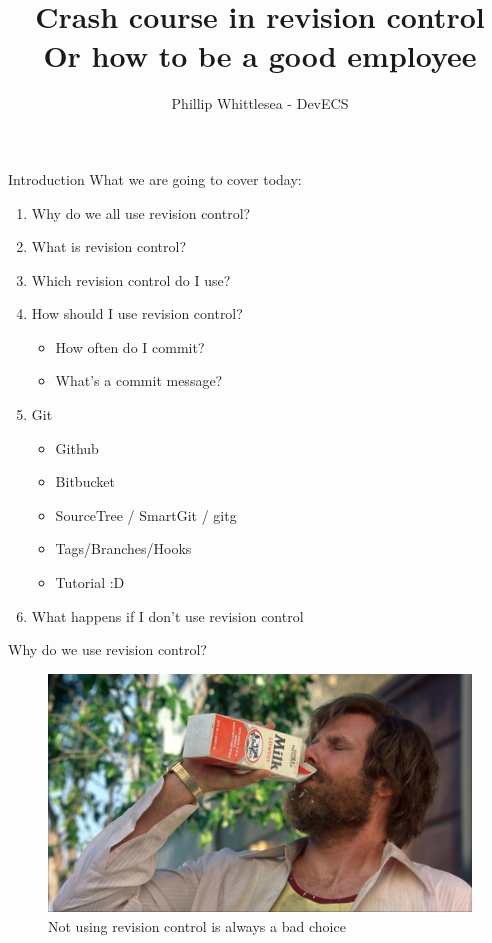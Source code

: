 \documentclass{beamer}
\title[Using Git like a baus]{Crash course in revision control\\Or how to be a good employee}
\author{Phillip Whittlesea - DevECS}
\institute{Electronics and Computer Science}
\begin{document}
\begin{frame}
\titlepage
\end{frame}

\begin{frame}{Introduction}
What we are going to cover today:
\begin{enumerate}
\item Why do we all use revision control?
\item What is revision control?
\item Which revision control do I use?
\item How should I use revision control?
\begin{itemize}
	\item How often do I commit?
	\item What's a commit message?
\end{itemize}
\item Git
\begin{itemize}
	\item Github
	\item Bitbucket
	\item SourceTree / SmartGit / gitg
	\item Tags/Branches/Hooks
	\item Tutorial :D
\end{itemize}
\item What happens if I don't use revision control
\end{enumerate}
\end{frame}

\begin{frame}{Why do we use revision control?}
\begin{figure}[ht]
\centering
\includegraphics[width=0.8\linewidth]{img/losing.jpg}
\caption{Not using revision control is always a bad choice}
\label{fig:figure2}
\end{figure}
\end{frame}
\end{document}
